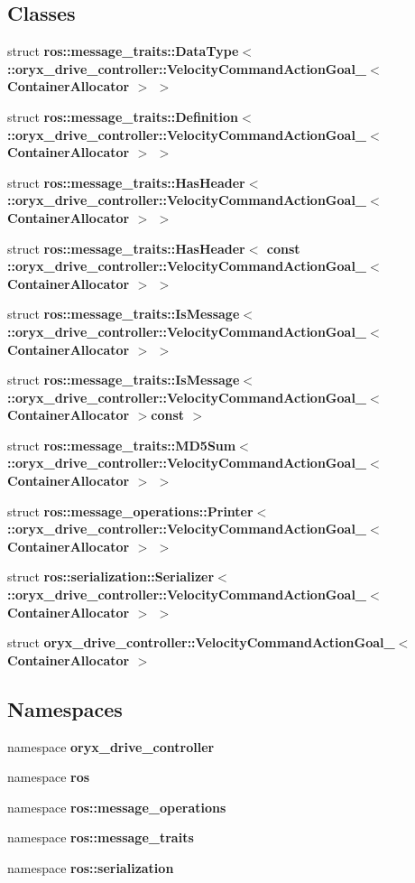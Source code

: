 \subsection*{\-Classes}
\begin{DoxyCompactItemize}
\item 
struct {\bf ros\-::message\-\_\-traits\-::\-Data\-Type$<$ \-::oryx\-\_\-drive\-\_\-controller\-::\-Velocity\-Command\-Action\-Goal\-\_\-$<$ Container\-Allocator $>$ $>$}
\item 
struct {\bf ros\-::message\-\_\-traits\-::\-Definition$<$ \-::oryx\-\_\-drive\-\_\-controller\-::\-Velocity\-Command\-Action\-Goal\-\_\-$<$ Container\-Allocator $>$ $>$}
\item 
struct {\bf ros\-::message\-\_\-traits\-::\-Has\-Header$<$ \-::oryx\-\_\-drive\-\_\-controller\-::\-Velocity\-Command\-Action\-Goal\-\_\-$<$ Container\-Allocator $>$ $>$}
\item 
struct {\bf ros\-::message\-\_\-traits\-::\-Has\-Header$<$ const \-::oryx\-\_\-drive\-\_\-controller\-::\-Velocity\-Command\-Action\-Goal\-\_\-$<$ Container\-Allocator $>$ $>$}
\item 
struct {\bf ros\-::message\-\_\-traits\-::\-Is\-Message$<$ \-::oryx\-\_\-drive\-\_\-controller\-::\-Velocity\-Command\-Action\-Goal\-\_\-$<$ Container\-Allocator $>$ $>$}
\item 
struct {\bf ros\-::message\-\_\-traits\-::\-Is\-Message$<$ \-::oryx\-\_\-drive\-\_\-controller\-::\-Velocity\-Command\-Action\-Goal\-\_\-$<$ Container\-Allocator $>$const  $>$}
\item 
struct {\bf ros\-::message\-\_\-traits\-::\-M\-D5\-Sum$<$ \-::oryx\-\_\-drive\-\_\-controller\-::\-Velocity\-Command\-Action\-Goal\-\_\-$<$ Container\-Allocator $>$ $>$}
\item 
struct {\bf ros\-::message\-\_\-operations\-::\-Printer$<$ \-::oryx\-\_\-drive\-\_\-controller\-::\-Velocity\-Command\-Action\-Goal\-\_\-$<$ Container\-Allocator $>$ $>$}
\item 
struct {\bf ros\-::serialization\-::\-Serializer$<$ \-::oryx\-\_\-drive\-\_\-controller\-::\-Velocity\-Command\-Action\-Goal\-\_\-$<$ Container\-Allocator $>$ $>$}
\item 
struct {\bf oryx\-\_\-drive\-\_\-controller\-::\-Velocity\-Command\-Action\-Goal\-\_\-$<$ Container\-Allocator $>$}
\end{DoxyCompactItemize}
\subsection*{\-Namespaces}
\begin{DoxyCompactItemize}
\item 
namespace {\bf oryx\-\_\-drive\-\_\-controller}
\item 
namespace {\bf ros}
\item 
namespace {\bf ros\-::message\-\_\-operations}
\item 
namespace {\bf ros\-::message\-\_\-traits}
\item 
namespace {\bf ros\-::serialization}
\end{DoxyCompactItemize}
